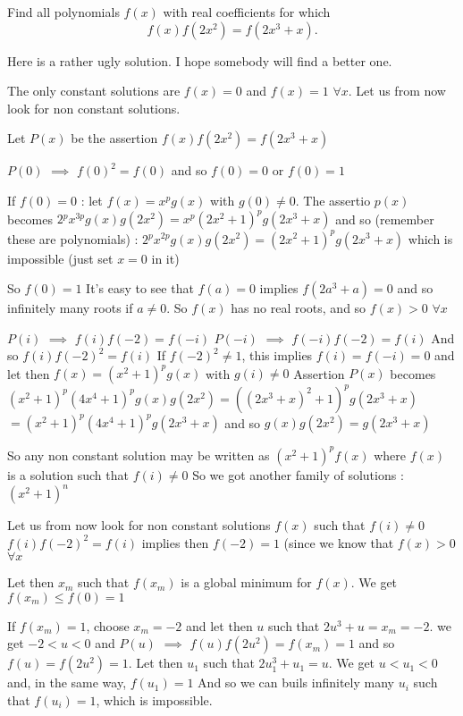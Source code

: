\begin{solution}
	\begin{tcolorbox}Find all polynomials $f(x)$ with real coefficients for which
\[f(x)f(2x^2) = f(2x^3 + x).\]\end{tcolorbox}
Here is a rather ugly solution. I hope somebody will find a better one.

The only constant solutions are $f(x)=0$ and $f(x)=1$ $\forall x$. Let us from now look for non constant solutions.

Let $P(x)$ be the assertion $f(x)f(2x^2)=f(2x^3+x)$

$P(0)$ $\implies$ $f(0)^2=f(0)$ and so $f(0)=0$ or $f(0)=1$

If $f(0)=0$ : let $f(x)=x^pg(x)$ with $g(0)\ne 0$. The assertio $p(x)$ becomes $2{}^px{}^{3p}g(x)g(2x^2)=x^p(2x^2+1)^pg(2x^3+x)$
and so (remember these are polynomials) : $2{}^px{}^{2p}g(x)g(2x^2)=(2x^2+1)^pg(2x^3+x)$ which is impossible (just set $x=0$ in it)

So $f(0)=1$
It's easy to see that $f(a)=0$ implies $f(2a^3+a)=0$ and so infinitely many roots if $a\ne 0$. So $f(x)$ has no real roots, and so $f(x)>0$ $\forall x$

$P(i)$ $\implies$ $f(i)f(-2)=f(-i)$
$P(-i)$ $\implies$ $f(-i)f(-2)=f(i)$
And so $f(i)f(-2)^2=f(i)$
If $f(-2)^2\ne 1$, this implies $f(i)=f(-i)=0$ and let then $f(x)=(x^2+1)^pg(x)$ with $g(i)\ne 0$
Assertion $P(x)$ becomes $(x^2+1)^p(4x^4+1)^pg(x)g(2x^2)=((2x^3+x)^2+1)^pg(2x^3+x)$ $=(x^2+1)^p(4x^4+1)^pg(2x^3+x)$ and so $g(x)g(2x^2)=g(2x^3+x)$

So any non constant solution may be written as $(x^2+1)^pf(x)$ where $f(x)$ is a solution such that $f(i)\ne 0$
So we got another family of solutions : $(x^2+1)^n$

Let us from now look for non constant solutions $f(x)$ such that $f(i)\ne 0$
$f(i)f(-2)^2=f(i)$ implies then $f(-2)=1$ (since we know that $f(x)>0$ $\forall x$

Let then $x_m$ such that $f(x_m)$ is a global minimum for $f(x)$. We get $f(x_m)\le f(0)=1$

If $f(x_m)=1$, choose $x_m=-2$ and let then $u$ such that $2u^3+u=x_m=-2$. we get $-2<u<0$ and $P(u)$ $\implies$ $f(u)f(2u^2)=f(x_m)=1$ and so $f(u)=f(2u^2)=1$. 
Let then $u_1$ such that $2u_1^3+u_1=u$. We get $u<u_1<0$ and, in the same way, $f(u_1)=1$
And so we can buils infinitely many $u_i$ such that $f(u_i)=1$, which is impossible.


\end{solution}
